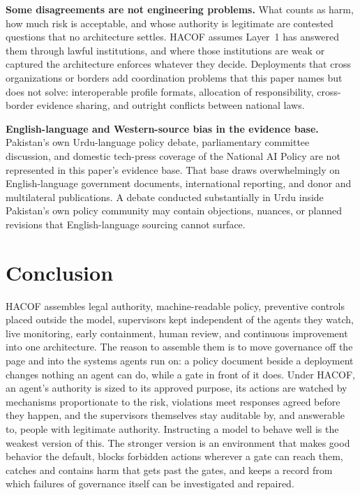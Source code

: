 \documentclass{ieeeaccess}
\newcommand{\hacof}{HACOF}
\begin{document}
\textbf{Some disagreements are not engineering problems.} What counts as harm, how much risk is acceptable, and whose authority is legitimate are contested questions that no architecture settles. \hacof{} assumes Layer~1 has answered them through lawful institutions, and where those institutions are weak or captured the architecture enforces whatever they decide. Deployments that cross organizations or borders add coordination problems that this paper names but does not solve: interoperable profile formats, allocation of responsibility, cross-border evidence sharing, and outright conflicts between national laws.

\textbf{English-language and Western-source bias in the evidence base.} Pakistan's own Urdu-language policy debate, parliamentary committee discussion, and domestic tech-press coverage of the National AI Policy are not represented in this paper's evidence base. That base draws overwhelmingly on English-language government documents, international reporting, and donor and multilateral publications. A debate conducted substantially in Urdu inside Pakistan's own policy community may contain objections, nuances, or planned revisions that English-language sourcing cannot surface.

\section{Conclusion}
\label{sec:conclusion}

\hacof{} assembles legal authority, machine-readable policy, preventive controls placed outside the model, supervisors kept independent of the agents they watch, live monitoring, early containment, human review, and continuous improvement into one architecture. The reason to assemble them is to move governance off the page and into the systems agents run on: a policy document beside a deployment changes nothing an agent can do, while a gate in front of it does. Under \hacof{}, an agent's authority is sized to its approved purpose, its actions are watched by mechanisms proportionate to the risk, violations meet responses agreed before they happen, and the supervisors themselves stay auditable by, and answerable to, people with legitimate authority. Instructing a model to behave well is the weakest version of this. The stronger version is an environment that makes good behavior the default, blocks forbidden actions wherever a gate can reach them, catches and contains harm that gets past the gates, and keeps a record from which failures of governance itself can be investigated and repaired.
\end{document}
